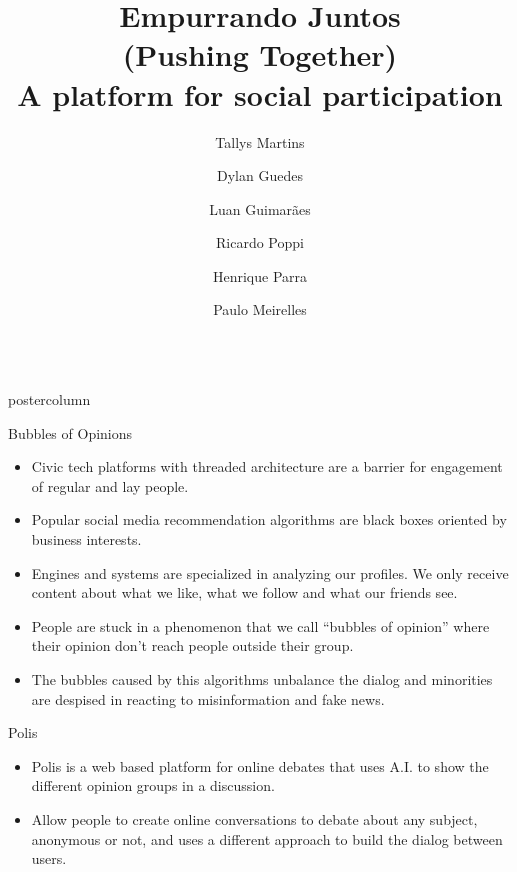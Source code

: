 \documentclass[final,hyperref={pdfpagelabels=false}]{beamer}
\title{\huge\bfseries\hspace*{-1em} Empurrando Juntos\\(Pushing Together)\\A platform for social participation}
\date{}
\author{\large Tallys Martins
\and Dylan Guedes
\and Luan Guimarães \\
\and Ricardo Poppi
\and Henrique Parra
\and Paulo Meirelles
}
\institute[UNB/CD]{University of Brasília and Cidade Democrática Institute, Brazil}
\newlength{\columnheight}
\begin{document}
\begin{frame}
  \begin{columns}
    \begin{column}{.49\textwidth}
      \begin{beamercolorbox}[center,wd=\textwidth]{postercolumn}
        \begin{minipage}[T]{.95\textwidth}
          \parbox[t][\columnheight]{\textwidth}{

\begin{block}{Bubbles of Opinions}
  \begin{itemize}

    \item Civic tech platforms with threaded architecture are a barrier for
    engagement of regular and lay people. 

    \item Popular social media recommendation algorithms are black boxes 
    oriented by business interests.

    \item Engines and systems are specialized in analyzing our profiles. We only receive
    content about what we like, what we follow and what our friends see.

    \item People are stuck in a phenomenon that we call ``bubbles of opinion'' where
    their opinion don't reach people outside their group.

    \item The bubbles caused by this algorithms unbalance the dialog and minorities
    are despised in reacting to misinformation and fake news.
  \end{itemize}
\end{block}

\begin{block}{Polis}
  \begin{itemize}
    \item Polis is a web based platform for online debates that uses A.I. to
    show the different opinion groups in a discussion.

    \item Allow people to create online conversations to debate about any subject,
    anonymous or not, and uses a different approach to build the dialog between users.


\end{itemize}
\end{block}}
\end{minipage}
\end{beamercolorbox}
\end{column}
\end{columns}
\end{frame}
\end{document}
